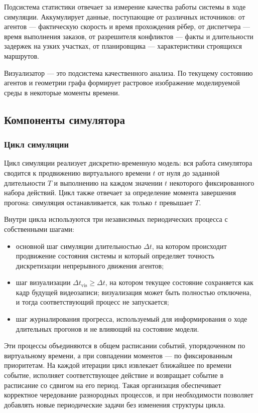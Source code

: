 Подсистема статистики отвечает за измерение качества работы системы в ходе симуляции. Аккумулирует данные, 
поступающие от различных источников: от агентов --- фактическую скорость и время прохождения рёбер, 
от диспетчера --- время выполнения заказов, от разрешителя конфликтов --- факты и длительности задержек 
на узких участках, от планировщика --- характеристики строящихся маршрутов.

Визуализатор --- это подсистема качественного анализа. По текущему состоянию агентов и геометрии 
графа формирует растровое изображение моделируемой среды в некоторые моменты времени.

\subsection{Компоненты симулятора}

\subsubsection{Цикл симуляции}

Цикл симуляции реализует дискретно-временную модель: вся работа симулятора сводится к продвижению виртуального
времени $t$ от нуля до заданной длительности $T$ и выполнению на каждом значении $t$ некоторого
фиксированного набора действий. Цикл также отвечает за определение момента завершения прогона:
симуляция останавливается, как только $t$ превышает $T$.

Внутри цикла используются три независимых периодических процесса с собственными шагами:

\begin{itemize}
\item основной шаг симуляции длительностью $\Delta t$, на котором происходит продвижение
      состояния системы и который определяет точность дискретизации непрерывного движения
      агентов;
\item шаг визуализации $\Delta t_{\mathrm{vis}} \geq \Delta t$, на котором текущее состояние
      сохраняется как кадр будущей видеозаписи; визуализация может быть полностью отключена,
      и тогда соответствующий процесс не запускается;
\item шаг журналирования прогресса, используемый для информирования о ходе
      длительных прогонов и не влияющий на состояние модели.
\end{itemize}

Эти процессы объединяются в общем расписании событий, упорядоченном по виртуальному времени, а при
совпадении моментов --- по фиксированным приоритетам. На каждой итерации цикл извлекает ближайшее
по времени событие, исполняет соответствующее действие и возвращает событие в расписание со
сдвигом на его период. Такая организация обеспечивает корректное чередование разнородных
процессов, и при необходимости позволяет добавлять новые периодические задачи без изменения
структуры цикла.


